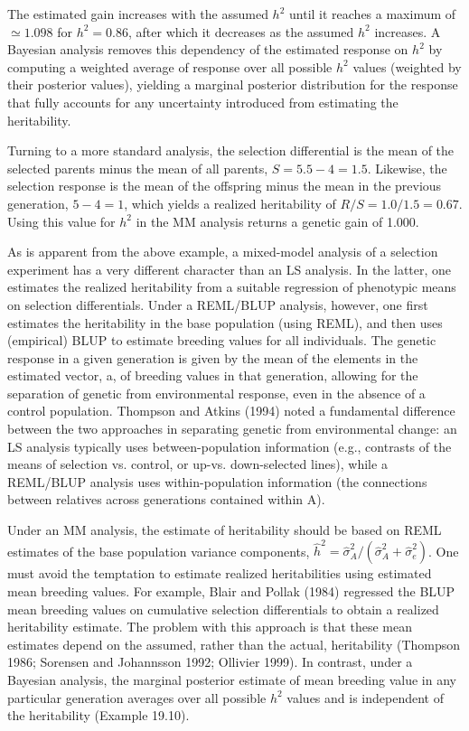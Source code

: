 \documentclass{article}
\begin{document}
The estimated gain increases with the assumed  $ h^2 $ until it reaches a maximum of  $ \simeq1.098 $ for  $ h^2 = 0.86 $, after which it decreases as the assumed  $ h^2 $ increases. A Bayesian analysis removes this dependency of the estimated response on  $ h^2 $ by computing a weighted average of response over all possible  $ h^2 $ values (weighted by their posterior values), yielding a marginal posterior distribution for the response that fully accounts for any uncertainty introduced from estimating the heritability.

Turning to a more standard analysis, the selection differential is the mean of the selected parents minus the mean of all parents,  $ S = 5.5 - 4 = 1.5 $. Likewise, the selection response is the mean of the offspring minus the mean in the previous generation,  $ 5 - 4 = 1 $, which yields a realized heritability of  $ R/S = 1.0/1.5 = 0.67 $. Using this value for  $ h^2 $ in the MM analysis returns a genetic gain of 1.000.

As is apparent from the above example, a mixed-model analysis of a selection experiment has a very different character than an LS analysis. In the latter, one estimates the realized heritability from a suitable regression of phenotypic means on selection differentials. Under a REML/BLUP analysis, however, one first estimates the heritability in the base population (using REML), and then uses (empirical) BLUP to estimate breeding values for all individuals. The genetic response in a given generation is given by the mean of the elements in the estimated vector, a, of breeding values in that generation, allowing for the separation of genetic from environmental response, even in the absence of a control population. Thompson and Atkins (1994) noted a fundamental difference between the two approaches in separating genetic from environmental change: an LS analysis typically uses between-population information (e.g., contrasts of the means of selection vs. control, or up-vs. down-selected lines), while a REML/BLUP analysis uses within-population information (the connections between relatives across generations contained within A).

Under an MM analysis, the estimate of heritability should be based on REML estimates of the base population variance components,  $ \widehat{h}^2 = \widehat{\sigma}_A^2 / (\widehat{\sigma}_A^2 + \widehat{\sigma}_e^2) $. One must avoid the temptation to estimate realized heritabilities using estimated mean breeding values. For example, Blair and Pollak (1984) regressed the BLUP mean breeding values on cumulative selection differentials to obtain a realized heritability estimate. The problem with this approach is that these mean estimates depend on the assumed, rather than the actual, heritability (Thompson 1986; Sorensen and Johannsson 1992; Ollivier 1999). In contrast, under a Bayesian analysis, the marginal posterior estimate of mean breeding value in any particular generation averages over all possible  $ h^2 $ values and is independent of the heritability (Example 19.10).
\end{document}
